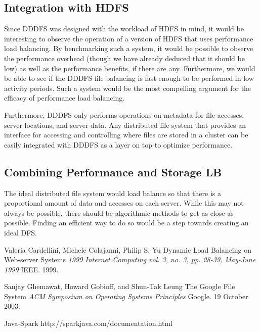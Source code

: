 \documentclass[twoside]{article}
\begin{document}
\begin{multicols}{2}
\subsection*{Integration with HDFS}
Since DDDFS was designed with the workload of HDFS in mind, it would be interesting to observe the operation of a version of HDFS that uses performance load balancing. By benchmarking such a system, it would be possible to observe the performance overhead (though we have already deduced that it should be low) as well as the performance benefits, if there are any. Furthermore, we would be able to see if the DDDFS file balancing is fast enough to be performed in low activity periods. Such a system would be the most compelling argument for the efficacy of performance load balancing.

Furthermore, DDDFS only performs operations on metadata for file accesses, server locations, and server data. Any distributed file system that provides an interface for accessing and controlling where files are stored in a cluster can be easily integrated with DDDFS as a layer on top to optimize performance.

\subsection*{Combining Performance and Storage LB}
The ideal distributed file system would load balance so that there is a proportional amount of data and accesses on each server. While this may not always be possible, there should be algorithmic methods to get as close as possible. Finding an efficient way to do so would be a step towards creating an ideal DFS.

\begin{thebibliography}{99} %
 Valeria Cardellini, Michele Colajanni, Philip S. Yu
\newblock Dynamic Load Balancing on Web-server Systems
\newblock \textit{1999 Internet Computing vol. 3, no. 3, pp. 28-39, May-June 1999}
\newblock IEEE. 1999.

 Sanjay Ghemawat, Howard Gobioff, and Shun-Tak Leung
\newblock The Google File System
\newblock \textit{ACM Symposium on Operating Systems Principles}
\newblock Google. 19 October 2003.

 Java-Spark
\newblock http://sparkjava.com/documentation.html


\end{thebibliography}
\end{multicols}
\end{document}
